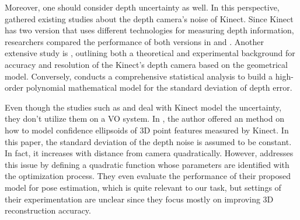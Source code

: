 \documentclass[a4paper]{report}
\numberwithin{figure}{section}
\begin{document}
Moreover, one should consider depth uncertainty as well. In this perspective,
\parencite{Mallick2014b} gathered existing studies about the depth
camera's noise of Kinect. Since Kinect has two version that uses different
technologies for measuring depth information, researchers compared the
performance of both versions in \parencite{Wasenmuller2017b} and 
\parencite{Kinect2015}.
Another extensive study is \parencite{Khoshelham2012a}, outlining both a 
theoretical
and experimental background for accuracy and resolution of the Kinect's depth
camera based on the geometrical model.  Conversely, \parencite{Choo2014} 
conducts a
comprehensive statistical analysis to build a high-order polynomial
mathematical model for the standard deviation of depth error.

Even though the studies such as \parencite{Park2012a} and 
\parencite{Nguyen2012a} 
deal with Kinect model the uncertainty, they don't utilize them on a VO 
system. In
\parencite{Park2012a}, the author offered an method on how 
to
model confidence ellipsoids of 3D point features measured by Kinect. In this
paper, the standard deviation of the depth noise is assumed to be constant.  In
fact, it increases with distance from camera quadratically. However, 
\parencite{Nguyen2012a} addresses this issue by defining a quadratic function 
whose parameters
are identified with the optimization process.  They even evaluate the
performance of their proposed model for pose estimation, which is quite
relevant to our task, but settings of their experimentation are unclear since
they focus mostly on improving 3D reconstruction accuracy.
\end{document}
